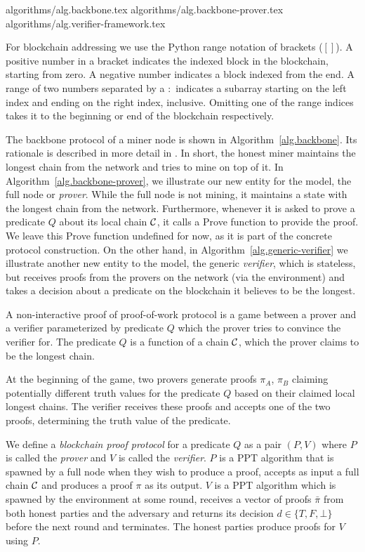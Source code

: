 
{algorithms/alg.backbone.tex}
{algorithms/alg.backbone-prover.tex}
{algorithms/alg.verifier-framework.tex}

For blockchain addressing we use the Python range notation of brackets ($[]$).
A positive number in a bracket indicates the indexed block in the blockchain,
starting from zero. A negative number indicates a block indexed from the end. A
range of two numbers separated by a $:$ indicates a subarray starting on the
left index and ending on the right index, inclusive. Omitting one of the range
indices takes it to the beginning or end of the blockchain respectively.

The backbone protocol of a miner node is shown in Algorithm~\ref{alg.backbone}.
Its rationale is described in more detail in \cite{backbone}. In short, the
honest miner maintains the longest chain from the network and tries to mine on
top of it. In Algorithm~\ref{alg.backbone-prover}, we illustrate our new entity
for the model, the full node or \textit{prover}. While the full node is not
mining, it maintains a state with the longest chain from the network.
Furthermore, whenever it is asked to prove a predicate $Q$ about its local
chain $\mathcal{C}$, it calls a Prove function to provide the proof. We leave this
Prove function undefined for now, as it is part of the concrete protocol
construction. On the other hand, in Algorithm~\ref{alg.generic-verifier} we
illustrate another new entity to the model, the generic \textit{verifier},
which is stateless, but receives proofs from the provers on the network (via
the environment) and takes a decision about a predicate on the blockchain it
believes to be the longest.

A non-interactive proof of proof-of-work protocol is a game between a prover
and a verifier parameterized by predicate $Q$ which the prover tries to
convince the verifier for. The predicate $Q$ is a function of a chain $\mathcal{C}$,
which the prover claims to be the longest chain.

At the beginning of the game, two provers generate proofs $\pi_A$, $\pi_B$
claiming potentially different truth values for the predicate $Q$ based on
their claimed local longest chains. The verifier receives these proofs and
accepts one of the two proofs, determining the truth value of the predicate.

We define a \textit{blockchain proof protocol} for a predicate $Q$ as a pair
$(P, V)$ where $P$ is called the \textit{prover} and $V$ is called the
\textit{verifier}. $P$ is a PPT algorithm that is spawned by a full node
when they wish to produce a proof, accepts as input a full chain $\mathcal{C}$ and
produces a proof $\pi$ as its output. $V$ is a PPT algorithm which is spawned
by the environment at some round, receives a vector of proofs $\bar{\pi}$ from
both honest parties and the adversary and returns its decision $d \in \{T, F,
\bot\}$ before the next round and terminates. The honest parties produce proofs
for $V$ using $P$.
